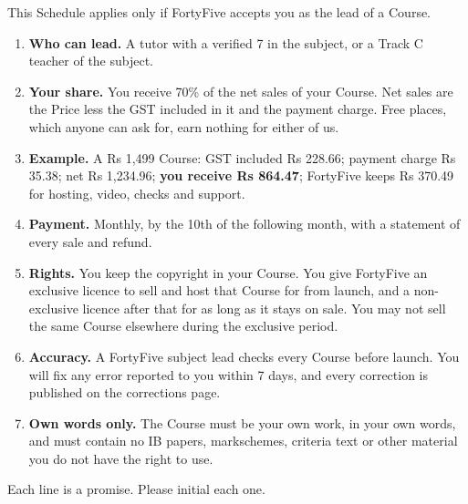 \documentclass[11pt]{article}
\begin{document}

This Schedule applies only if FortyFive accepts you as the lead of a Course.

\begin{enumerate}[label=\arabic*.,leftmargin=1.8em,itemsep=0.35em]
  \item \textbf{Who can lead.} A tutor with a verified 7 in the subject, or a Track C teacher of the subject.
  \item \textbf{Your share.} You receive 70\% of the net sales of your Course. Net sales are the Price less the GST included in it and the payment charge. Free places, which anyone can ask for, earn nothing for either of us.
  \item \textbf{Example.} A Rs 1,499 Course: GST included Rs 228.66; payment charge Rs 35.38; net Rs 1,234.96; \textbf{you receive Rs 864.47}; FortyFive keeps Rs 370.49 for hosting, video, checks and support.
  \item \textbf{Payment.} Monthly, by the 10th of the following month, with a statement of every sale and refund.
  \item \textbf{Rights.} You keep the copyright in your Course. You give FortyFive an exclusive licence to sell and host that Course for  from launch, and a non-exclusive licence after that for as long as it stays on sale. You may not sell the same Course elsewhere during the exclusive period.
  \item \textbf{Accuracy.} A FortyFive subject lead checks every Course before launch. You will fix any error reported to you within 7 days, and every correction is published on the corrections page.
  \item \textbf{Own words only.} The Course must be your own work, in your own words, and must contain no IB papers, markschemes, criteria text or other material you do not have the right to use.
\end{enumerate}


Each line is a promise. Please initial each one.
\end{document}
